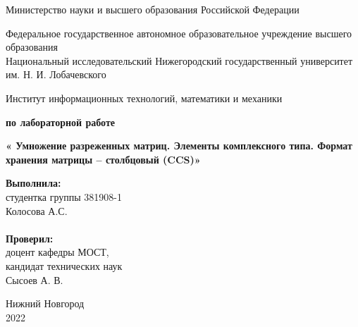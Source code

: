 \documentclass{report}
\begin{document}
\begin{titlepage}

\begin{center}
Министерство науки и высшего образования Российской Федерации
\end{center}

\begin{center}
Федеральное государственное автономное образовательное учреждение высшего образования \\
Национальный исследовательский Нижегородский государственный университет им. Н. И. Лобачевского
\end{center}

\begin{center}
Институт информационных технологий, математики и механики
\end{center}

\vspace{4em}

\begin{center}
\textbf{ по лабораторной работе} \\
\end{center}
\begin{center}
\textbf{\Large«
Умножение разреженных матриц. Элементы комплексного типа. Формат хранения матрицы – столбцовый (CCS)»} \\
\end{center}

\vspace{4em}

\newbox{\lbox}
\newlength{\maxl}
\setlength{\maxl}{\wd\lbox}
\hfill\parbox{7cm}{
\hspace*{5cm}\hspace*{-5cm}\textbf{Выполнила:}
\\ студентка группы 381908-1
\\ Колосова А.С.
\\\\
\hspace*{5cm}\hspace*{-5cm}\textbf{Проверил:}
\\ доцент кафедры МОСТ,
\\ кандидат технических наук
\\ Сысоев А. В.\\
}
\vspace{\fill}

\begin{center} Нижний Новгород \\ 2022 \end{center}

\end{titlepage}
\end{document}
